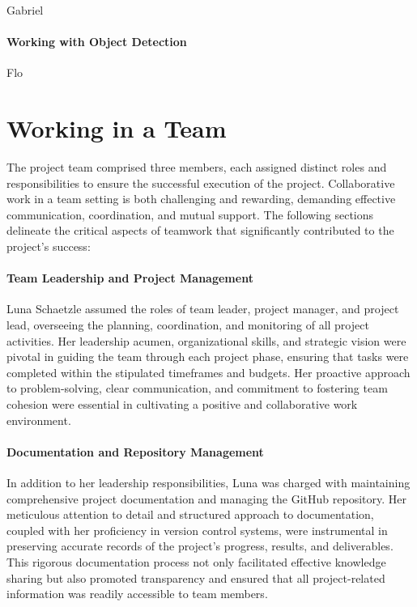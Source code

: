 Gabriel

\paragraph{Working with Object Detection}

Flo

\section{Working in a Team}

The project team comprised three members, each assigned distinct roles and responsibilities to ensure the successful execution of the project. Collaborative work in a team setting is both challenging and rewarding, demanding effective communication, coordination, and mutual support. The following sections delineate the critical aspects of teamwork that significantly contributed to the project’s success:

\paragraph{Team Leadership and Project Management}  
Luna Schaetzle assumed the roles of team leader, project manager, and project lead, overseeing the planning, coordination, and monitoring of all project activities. Her leadership acumen, organizational skills, and strategic vision were pivotal in guiding the team through each project phase, ensuring that tasks were completed within the stipulated timeframes and budgets. Her proactive approach to problem-solving, clear communication, and commitment to fostering team cohesion were essential in cultivating a positive and collaborative work environment.

\paragraph{Documentation and Repository Management}  
In addition to her leadership responsibilities, Luna was charged with maintaining comprehensive project documentation and managing the GitHub repository. Her meticulous attention to detail and structured approach to documentation, coupled with her proficiency in version control systems, were instrumental in preserving accurate records of the project’s progress, results, and deliverables. This rigorous documentation process not only facilitated effective knowledge sharing but also promoted transparency and ensured that all project-related information was readily accessible to team members.

